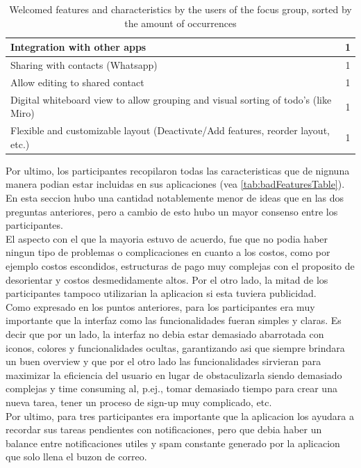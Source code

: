 \begin{table}[!htbp]
\begin{adjustbox}{width=1.2\textwidth,center=\textwidth}
\begin{tabular}{|l|l|}
        Integration with other apps                                                        & \multicolumn{1}{c|}{1} \\ \hline
        Sharing with contacts (Whatsapp)                                                   & \multicolumn{1}{c|}{1} \\ \hline
        Allow editing to shared contact                                                    & \multicolumn{1}{c|}{1} \\ \hline
        Digital whiteboard view to allow grouping and visual sorting of todo's (like Miro) & \multicolumn{1}{c|}{1} \\ \hline
        Flexible and customizable layout (Deactivate/Add features, reorder layout, etc.)   & \multicolumn{1}{c|}{1} \\ \hline
    \end{tabular}
    \end{adjustbox}
    \caption{Welcomed features and characteristics by the users of the focus group, sorted by the amount of occurrences}
    \label{tab:niceFeaturesTable}
\end{table}
\FloatBarrier

Por ultimo, los participantes recopilaron todas las caracteristicas que de nignuna manera podian estar incluidas en sus aplicaciones (vea \ref{tab:badFeaturesTable}). En esta seccion hubo una cantidad notablemente menor de ideas que en las dos preguntas anteriores, pero a cambio de esto hubo un mayor consenso entre los participantes.\\
El aspecto con el que la mayoria estuvo de acuerdo, fue que no podia haber ningun tipo de problemas o complicaciones en cuanto a los costos, como por ejemplo costos escondidos, estructuras de pago muy complejas con el proposito de desorientar y costos desmedidamente altos. Por el otro lado, la mitad de los participantes tampoco utilizarian la aplicacion si esta tuviera publicidad. \\
Como expresado en los puntos anteriores, para los participantes era muy importante que la interfaz como las funcionalidades fueran simples y claras. Es decir que por un lado, la interfaz no debia estar demasiado abarrotada con iconos, colores y funcionalidades ocultas, garantizando asi que siempre brindara un buen overview y que por el otro lado las funcionalidades sirvieran para maximizar la eficiencia del usuario en lugar de obstaculizarla siendo demasiado complejas y time consuming al, p.ej., tomar demasiado tiempo para crear una nueva tarea, tener un proceso de sign-up muy complicado, etc.\\
Por ultimo, para tres participantes era importante que la aplicacion los ayudara a recordar sus tareas pendientes con notificaciones, pero que debia haber un balance entre notificaciones utiles y spam constante generado por la aplicacion que solo llena el buzon de correo. 

